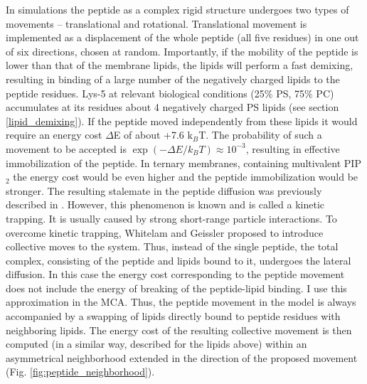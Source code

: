 In simulations the peptide as a complex rigid structure undergoes two types of movements -- translational and rotational. Translational movement is implemented as a displacement of the whole peptide (all five residues) in one out of six directions, chosen at random. Importantly, if the mobility of the peptide is lower than that of the membrane lipids, the lipids will perform a fast demixing, resulting in binding of a large number of the negatively charged lipids to the peptide residues. Lys-5 at relevant biological conditions (25$\%$ PS, 75$\%$ PC) accumulates at its residues about 4 negatively charged PS lipids (see section \ref{lipid_demixing}). If the peptide moved independently from these lipids it would require an energy cost $\Delta$E of about +7.6 k$_B$T. The probability of such a movement to be accepted is $\exp(-\Delta E/k_B T) \approx 10^{-3}$, resulting in effective immobilization of the peptide. In ternary membranes, containing multivalent PIP$_2$ the energy cost would be even higher and the peptide immobilization would be stronger. The resulting stalemate in the peptide diffusion was previously described in \cite{Khelashvili2008}. However, this phenomenon is known and is called a kinetic trapping. It is usually caused by strong short-range particle interactions. To overcome kinetic trapping, Whitelam and Geissler \cite{Whitelam2007} proposed to introduce collective moves to the system. Thus, instead of the single peptide, the total complex, consisting of the peptide and lipids bound to it, undergoes the lateral diffusion. In this case the energy cost corresponding to the peptide movement does not include the energy of breaking of the peptide-lipid binding. I use this approximation in the MCA. Thus, the peptide movement in the model is always accompanied by a swapping of lipids directly bound to peptide residues with neighboring lipids. The energy cost of the resulting collective movement is then computed (in a similar way, described for the lipids above) within an asymmetrical neighborhood extended in the direction of the proposed movement (Fig. \ref{fig:peptide_neighborhood}).
